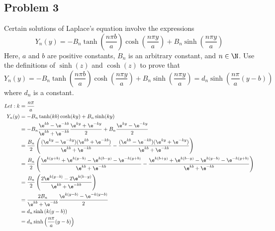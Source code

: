 \documentclass{math}
\begin{document}
\subsection*{Problem 3}
Certain solutions of Laplace's equation involve the expressions
\[ Y_n(y) = -B_n\tanh(\frac{n\pi b}{a})\cosh(\frac{n\pi y}{a})+
  B_n\sinh(\frac{n\pi y}{a}) \]
Here, \( a \) and \( b \) are positive constants, \( B_n \) is an arbitrary
constant, and \( n\in\N \). Use the definitions of \( \sinh(z) \) and
\( \cosh(z) \) to prove that
\[ Y_n(y) = -B_n\tanh(\frac{n\pi b}{a})\cosh(\frac{n\pi y}{a})+
  B_n\sinh(\frac{n\pi y}{a}) = d_n\sinh(\frac{n\pi}{a}(y-b)) \]
where \( d_n \) is a constant.
\begin{align*}
  Let: k &= \frac{n\pi}{a} \\
  Y_n(y) &= -B_n\tanh(kb)\cosh(ky)+B_n\sinh(ky) \\
  &= -B_n\frac{\e^{kb}-\e^{-kb}}{\e^{kb}+\e^{-kb}}\frac{\e^{ky}+\e^{-ky}}{2}+
    B_n\frac{\e^{ky}-\e^{-ky}}{2} \\
  &= \frac{B_n}{2}\left(
    \frac{(\e^{ky}-\e^{-ky})(\e^{kb}+\e^{-kb})}{\e^{kb}+\e^{-kb}}-
    \frac{(\e^{kb}-\e^{-kb})(\e^{ky}+\e^{-ky})}{\e^{kb}+\e^{-kb}}
    \right) \\
  &= \frac{B_n}{2}\left(
    \frac{\e^{k(y+b)}+\e^{k(y-b)}-\e^{k(b-y)}-\e^{-k(y+b)}}{\e^{kb}+\e^{-kb}}-
    \frac{\e^{k(b+y)}+\e^{k(b-y)}-\e^{k(y-b)}-\e^{-k(y+b)}}{\e^{kb}+\e^{-kb}}
  \right) \\
  &= \frac{B_n}{2}\left(
    \frac{2\e^{k(y-b)}-2\e^{k(b-y)}}{\e^{kb}+\e^{-kb}}
  \right) \\
  &= \frac{2B_n}{\e^{kb}+\e^{-kb}}\frac{\e^{k(y-b)}-\e^{-k(y-b)}}{2} \\
  &= d_n\sinh\left(k(y-b)\right) \\
  &= d_n\sinh\left(\frac{n\pi}{a}(y-b)\right)
\end{align*}
\end{document}
